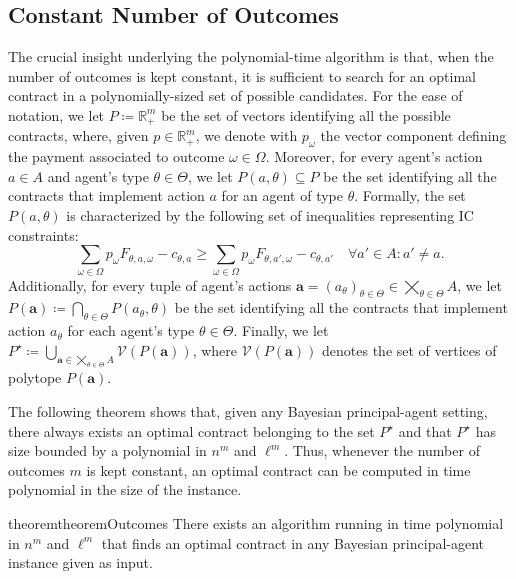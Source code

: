 \subsection{Constant Number of Outcomes}

The crucial insight underlying the polynomial-time algorithm is that, when the number of outcomes is kept constant, it is sufficient to search for an optimal contract in a polynomially-sized set of possible candidates.
%
For the ease of notation, we let $P \coloneqq \mathbb{R}_+^m$ be the set of vectors identifying all the possible contracts, where, given $p \in \mathbb{R}_+^m$, we denote with $p_\omega$ the vector component defining the payment associated to outcome $\omega \in \Omega$.
%
Moreover, for every agent's action $a \in A$ and agent's type $\theta \in \Theta$, we let $P(a,\theta) \subseteq P$ be the set identifying all the contracts that implement action $a$ for an agent of type $\theta$.
%
Formally, the set $P(a, \theta)$ is characterized by the following set of inequalities representing IC constraints:
%
\begin{equation}\label{eq:hyperplane}
	\sum_{\omega \in \Omega} p_\omega F_{\theta,a,\omega} -c_{\theta,a} \ge \sum_{\omega \in \Omega} p_\omega F_{\theta,a',\omega} -c_{\theta,a'} \quad \forall a' \in A : a' \neq a.
\end{equation}
%
Additionally, for every tuple of agent's actions $\textbf{a} = \left( a_\theta \right)_{\theta \in \Theta} \in \bigtimes_{\theta \in \Theta} A$, we let $P (\textbf{a}) \coloneqq \bigcap_{\theta \in \Theta} P(a_\theta, \theta)$ be the set identifying all the contracts that implement action $a_\theta$ for each agent's type $\theta \in \Theta$.
%
Finally, we let $P^\star \coloneqq \bigcup_{\textbf{a} \in \bigtimes_{\theta \in \Theta} A} \mathcal{V} (P(\textbf{a}))$, where $\mathcal{V}(P(\textbf{a}))$ denotes the set of vertices of polytope $P(\textbf{a})$.

The following theorem shows that, given any Bayesian principal-agent setting, there always exists an optimal contract belonging to the set $P^\star$ and that $P^\star$ has size bounded by a polynomial in $n^m$ and $\ell^m$.
%
Thus, whenever the number of outcomes $m$ is kept constant, an optimal contract can be computed in time polynomial in the size of the instance.


 \begin{restatable}{theorem}{theoremOutcomes}\label{thm:outcomes}
	There exists an algorithm running in time polynomial in $n^m$ and $\ell^m$ that finds an optimal contract in any Bayesian principal-agent instance given as input.
\end{restatable}

